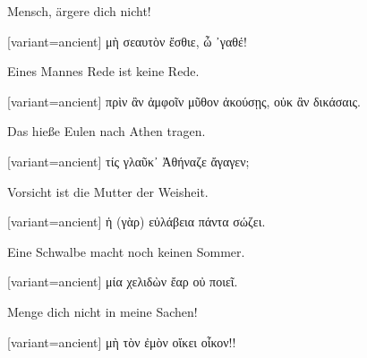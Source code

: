 Mensch, ärgere dich nicht!

\switchcolumn

\begin{greek}[variant=ancient]%
μὴ σεαυτὸν ἔσθιε, ὦ ᾽γαθέ!

\end{greek}%
\switchcolumn*

Eines Mannes Rede ist keine Rede.

\switchcolumn

\begin{greek}[variant=ancient]%
πρὶν ἂν ἀμφοῖν μῦθον ἀκούσῃς, οὐκ ἂν δικάσαις.

\end{greek}%
\switchcolumn*

Das hieße Eulen nach Athen tragen.

\switchcolumn

\begin{greek}[variant=ancient]%
τίς γλαῦκ᾽ Ἀθήναζε ἄγαγεν;

\end{greek}%
\switchcolumn*

Vorsicht ist die Mutter der Weis\textcompwordmark{}heit. 

\switchcolumn

\begin{greek}[variant=ancient]%
ἡ (γὰρ) εὐλάβεια πάντα σώζει.

\end{greek}%
\switchcolumn*

Eine Schwalbe macht noch keinen Sommer.

\switchcolumn

\begin{greek}[variant=ancient]%
μία χελιδὼν ἔαρ οὐ ποιεῖ.

\end{greek}%
\switchcolumn*

Menge dich nicht in meine Sachen!

\switchcolumn

\begin{greek}[variant=ancient]%
μὴ τὸν ἐμὸν οἴκει οἶκον!!

\end{greek}%
\switchcolumn*

